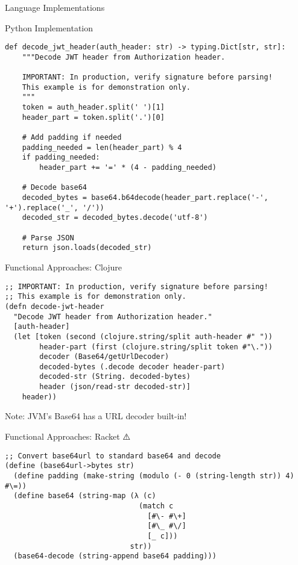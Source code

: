 \documentclass[presentation,aspectratio=169]{beamer}
\begin{document}
\begin{frame}[label={sec:orgcc55a06},fragile]{Language Implementations}
\begin{block}{Python Implementation 🧩}
\begin{verbatim}
def decode_jwt_header(auth_header: str) -> typing.Dict[str, str]:
    """Decode JWT header from Authorization header.

    IMPORTANT: In production, verify signature before parsing!
    This example is for demonstration only.
    """
    token = auth_header.split(' ')[1]
    header_part = token.split('.')[0]

    # Add padding if needed
    padding_needed = len(header_part) % 4
    if padding_needed:
        header_part += '=' * (4 - padding_needed)

    # Decode base64
    decoded_bytes = base64.b64decode(header_part.replace('-', '+').replace('_', '/'))
    decoded_str = decoded_bytes.decode('utf-8')

    # Parse JSON
    return json.loads(decoded_str)
\end{verbatim}
\end{block}
\begin{block}{Functional Approaches: Clojure 🧩}
\begin{verbatim}
;; IMPORTANT: In production, verify signature before parsing!
;; This example is for demonstration only.
(defn decode-jwt-header 
  "Decode JWT header from Authorization header."
  [auth-header]
  (let [token (second (clojure.string/split auth-header #" "))
        header-part (first (clojure.string/split token #"\."))
        decoder (Base64/getUrlDecoder)
        decoded-bytes (.decode decoder header-part)
        decoded-str (String. decoded-bytes)
        header (json/read-str decoded-str)]
    header))
\end{verbatim}

\alert{Note}: JVM's Base64 has a URL decoder built-in!
\end{block}
\begin{block}{Functional Approaches: Racket ⚠️}
\begin{verbatim}
;; Convert base64url to standard base64 and decode
(define (base64url->bytes str)
  (define padding (make-string (modulo (- 0 (string-length str)) 4) #\=))
  (define base64 (string-map (λ (c)
                               (match c
                                 [#\- #\+]
                                 [#\_ #\/]
                                 [_ c]))
                             str))
  (base64-decode (string-append base64 padding)))


\end{verbatim}
\end{block}
\end{frame}
\end{document}
